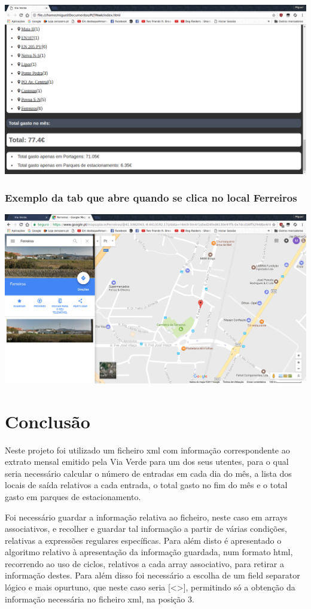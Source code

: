 \documentclass{report}
\begin{document}
\includegraphics[scale=0.35]{out4.png}

\subsection{Exemplo da tab que abre quando se clica no local Ferreiros}

\includegraphics[scale=0.35]{maps.png}\par

\chapter{Conclusão} \label{concl}
Neste projeto foi utilizado um ficheiro xml com informação correspondente ao extrato mensal emitido pela Via
Verde para um dos seus utentes, para o qual seria necessário calcular o número de entradas em cada dia do mês, a lista dos locais de saída relativos a cada entrada, o total gasto no fim do mês e o total gasto em parques de estacionamento.\par 

Foi necessário guardar a informação relativa ao ficheiro, neste caso em arrays associativos, e recolher e guardar tal informação a partir de várias condições, relativas a expressões regulares  específicas. Para além disto é apresentado o algoritmo relativo à apresentação da informação guardada, num formato html, recorrendo ao uso de ciclos, relativos a cada array associativo, para retirar a informação destes. Para além disso foi necessário a escolha de um field separator lógico e mais opurtuno, que neste caso seria [<>], permitindo só a obtenção da informação necessária no ficheiro xml, na posição 3.\par
\end{document}
